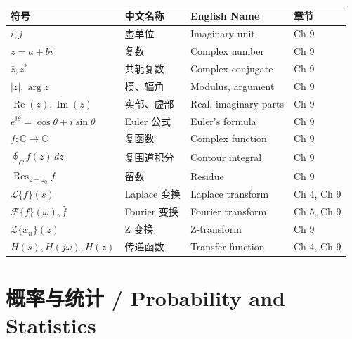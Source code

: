 \begin{center}
\renewcommand{\arraystretch}{1.25}
\begin{tabular}{@{}llll@{}}
\toprule
\textbf{符号} & \textbf{中文名称} & \textbf{English Name} & \textbf{章节} \\
\midrule
$i, j$ & 虚单位 & Imaginary unit & Ch 9 \\
$z = a + bi$ & 复数 & Complex number & Ch 9 \\
$\bar{z}, z^*$ & 共轭复数 & Complex conjugate & Ch 9 \\
$|z|, \arg z$ & 模、辐角 & Modulus, argument & Ch 9 \\
$\operatorname{Re}(z), \operatorname{Im}(z)$ & 实部、虚部 & Real, imaginary parts & Ch 9 \\
$e^{i\theta} = \cos\theta + i\sin\theta$ & Euler 公式 & Euler's formula & Ch 9 \\
$f: \mathbb{C} \to \mathbb{C}$ & 复函数 & Complex function & Ch 9 \\
$\displaystyle \oint_C f(z)\,dz$ & 复围道积分 & Contour integral & Ch 9 \\
$\operatorname{Res}_{z = z_0} f$ & 留数 & Residue & Ch 9 \\
$\mathcal{L}\{f\}(s)$ & Laplace 变换 & Laplace transform & Ch 4, Ch 9 \\
$\mathcal{F}\{f\}(\omega), \hat{f}$ & Fourier 变换 & Fourier transform & Ch 5, Ch 9 \\
$\mathcal{Z}\{x_n\}(z)$ & Z 变换 & Z-transform & Ch 9 \\
$H(s), H(j\omega), H(z)$ & 传递函数 & Transfer function & Ch 4, Ch 9 \\
\bottomrule
\end{tabular}
\end{center}

\section{概率与统计 / Probability and Statistics}

